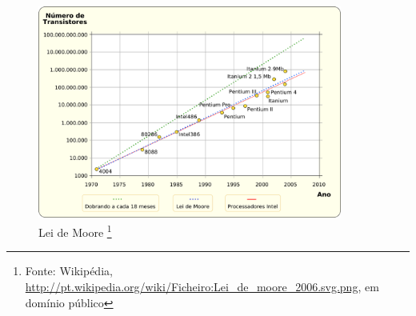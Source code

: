 \documentclass{beamer}
\begin{document}
\begin{frame}
\frametitle{}

\begin{figure}[htp]
\begin{center}
  \includegraphics[height=7cm]{Lei_de_moore_2006.png}
  \caption[map]{Lei de Moore \footnote{\tiny
  Fonte: Wikipédia, \url{http://pt.wikipedia.org/wiki/Ficheiro:Lei_de_moore_2006.svg.png},
  em domínio público}}
\end{center}
\end{figure}


\end{frame}
\end{document}

